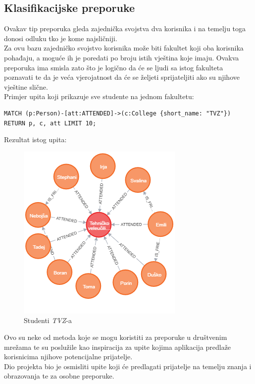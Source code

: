 \documentclass[titlepage, 12pt]{scrartcl}
\begin{document}
\subsection*{Klasifikacijske preporuke}
Ovakav tip preporuka gleda zajednička svojstva dva korisnika i na temelju toga donosi odluku tko je kome najsličniji. \\
Za ovu bazu zajedničko svojstvo korisnika može biti fakultet koji oba korisnika pohađaju, a moguće ih je poredati po broju istih vještina koje imaju. Ovakva preporuka ima smisla zato što je logično da će se ljudi sa istog fakulteta poznavati te da je veća vjerojatnost da će se željeti sprijateljiti ako su njihove vještine slične. \\
\newpage
Primjer upita koji prikazuje sve studente na jednom fakultetu:

\begin{samepage}
\begin{verbatim}
MATCH (p:Person)-[att:ATTENDED]->(c:College {short_name: "TVZ"})
RETURN p, c, att LIMIT 10;
\end{verbatim}
\end{samepage}

Rezultat istog upita:
\begin{figure}[h]
    \centering
    \includegraphics[scale=0.7]{slike/same_college.png}
    \caption{Studenti \emph{TVZ}-a}
    \label{fig:common_friends}
\end{figure}

Ovo su neke od metoda koje se mogu koristiti za preporuke u društvenim mrežama te su poslužile kao inspiracija za upite kojima aplikacija predlaže korisnicima njihove potencijalne prijatelje. \\
Dio projekta bio je osmisliti upite koji će predlagati prijatelje na temelju znanja i obrazovanja te za osobne preporuke.
\end{document}
